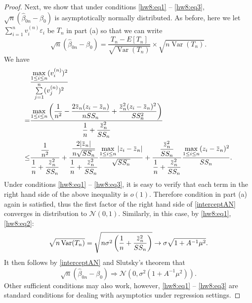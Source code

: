 \documentclass{article}
\newcommand{\eps}{\varepsilon}
\newcommand{\overbar}[1]{\mkern 1.5mu\overline{\mkern-1.5mu#1\mkern-1.5mu}\mkern 1.5mu}
\newcommand{\gaussian}{\mathcal{N}}
\DeclareMathOperator*{\Var}{Var}
\theoremstyle{definition}
\theoremstyle{plain}
\theoremstyle{remark}
\begin{document}
\begin{description}
\begin{description}
\begin{proof}
Next, we show that under conditions \eqref{hw8:eq1} -- \eqref{hw8:eq3}, $\sqrt{n}(\hat{\beta}_{0n} - \beta_0)$ is asymptotically normally distributed. As before, here we let $\sum\limits_{i = 1}^n v_i^{(n)} \eps_i$ be $T_n$ in part (a)
so that we can write
\begin{equation}\label{interceptAN}
\sqrt{n}(\hat{\beta}_{0n} - \beta_0) = \frac{T_n - E[T_n]}{\sqrt{\Var(T_n)}} \times \sqrt{n \Var(T_n)}.
\end{equation}
We have
\begin{align*}
& \frac{\max\limits_{1 \leq i \leq n} (v_i^{(n)})^2}{\sum\limits_{j = 1}^n (v_j^{(n)})^2} \\
= & \frac{\max\limits_{1 \leq i \leq n} \left(\dfrac{1}{n^2} - \dfrac{2\overbar{z}_n(z_i - \overbar{z}_n)}{nSS_n} + \dfrac{\overbar{z}_n^2(z_i - \overbar{z}_n)^2}{SS_n^2}\right)}{\dfrac{1}{n} + \dfrac{\overbar{z}_n^2}{SS_n}} \\
\leq & \frac{\dfrac{1}{n^2}}{\dfrac{1}{n} + \dfrac{\overbar{z}_n^2}{SS_n}} + \frac{\dfrac{2|\overbar{z}_n|}{n\sqrt{SS_n}}}{\dfrac{1}{n} + \dfrac{\overbar{z}_n^2}{SS_n}}\frac{\max\limits_{1 \leq i \leq n}|z_i - \overbar{z}_n|}{\sqrt{SS_n}}
+ \frac{\dfrac{\overbar{z}_n^2}{SS_n}}{\dfrac{1}{n} + \dfrac{\overbar{z}_n^2}{SS_n}}\frac{\max\limits_{1 \leq i \leq n}(z_i - \overbar{z}_n)^2}{SS_n}.
\end{align*}
Under conditions \eqref{hw8:eq1} -- \eqref{hw8:eq3}, it is easy to verify that each term in the right hand side of the above inequality is $o(1)$. Therefore condition in part (a) again is satisfied, thus the first factor of the right hand side of \eqref{interceptAN} converges in distribution to $\gaussian(0, 1)$. Similarly, in this case, by \eqref{hw8:eq1}, \eqref{hw8:eq2}:
\begin{align*}
\sqrt{n\Var(T_n)} = \sqrt{n \sigma^2 \left(\frac{1}{n} + \frac{\overbar{z}_n^2}{SS_n}\right)} \to \sigma \sqrt{1 + A^{-1}\mu^2}.
\end{align*}
It then follows by \eqref{interceptAN} and Slutsky's theorem that
$$\sqrt{n}(\hat{\beta}_{0n} - \beta_0) \Rightarrow \gaussian(0, \sigma^2(1 + A^{-1}\mu^2)).$$
Other sufficient conditions may also work, however, \eqref{hw8:eq1} -- \eqref{hw8:eq3} are standard conditions for dealing with asymptotics under regression settings.
\end{proof}
\end{description}


\end{description}
\end{document}
